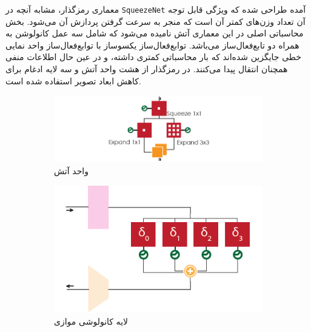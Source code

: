 معماری رمزگذار، مشابه آنچه در
\verb*|SqueezeNet|
آمده طراحی شده که ویژگی قابل توجه آن تعداد وزن‌های کمتر آن است که منجر به سرعت گرفتن پردازش آن می‌شود. بخش محاسباتی اصلی در این معماری آتش
نامیده می‌شود که شامل سه عمل کانولوشن به همراه دو تابع‌فعال‌ساز می‌باشد. توابع‌فعال‌ساز یکسوساز
با توابع‌فعال‌ساز واحد نمایی خطی
جایگزین شده‌اند که بار ‌محاسباتی کمتری داشته، و در عین حال اطلاعات منفی همچنان انتقال پیدا می‌کنند. در رمزگذار از هشت واحد آتش و سه لایه ادغام برای کاهش ابعاد تصویر استفاده شده است.

\begin{figure}[ht]
	\begin{subfigure}{\textwidth}
		\includegraphics[width=\linewidth, height=0.2\textheight]{Images/Chapter3/SQNet_fire.png}
		\caption{واحد آتش}
		\label{f64}
	\end{subfigure}
	\begin{subfigure}{0.45\textwidth}
		\includegraphics[width=\linewidth, height=0.2\textheight]{Images/Chapter3/SQNet_PDC.png}
		\caption{لایه کانولوشی موازی}
		\label{f65}
	\end{subfigure}
	\begin{subfigure}{0.45\textwidth}

\end{subfigure}
\end{figure}
